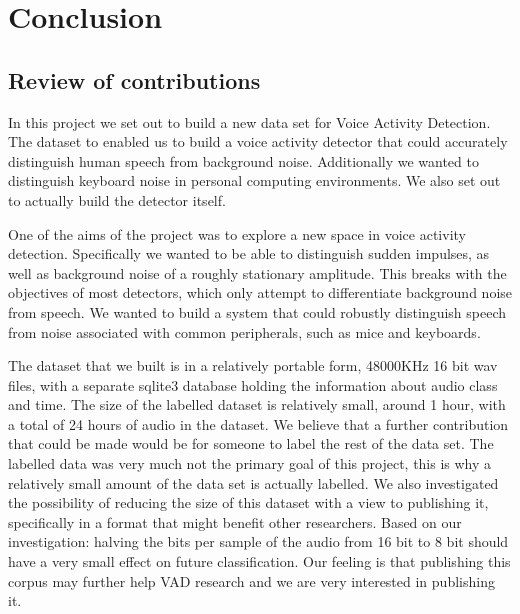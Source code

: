 \documentclass[ %
                    author={Sam Phippen},
                supervisor={Dr. Rafal Bogacz},
                     title={Real time voice activity detectors in noisy personal computing environments},
                  subtitle={},
                    degree={MEng},
                      year={2012} ]{thesis}
\begin{document}

\chapter{Conclusion}
\label{chap:conclusion}

\section{Review of contributions}

In this project we set out to build a new data set for Voice Activity
Detection.  The dataset to enabled us to build a voice activity detector that
could accurately distinguish human speech from background noise.  Additionally
we wanted to distinguish keyboard noise in personal computing environments. We
also set out to actually build the detector itself.


One of the aims of the project was to explore a new space in voice activity
detection.  Specifically we wanted to be able to distinguish sudden impulses,
as well as background noise of a roughly stationary amplitude. This breaks with
the objectives of most detectors, which only attempt to differentiate
background noise from speech. We wanted to build a system that could robustly
distinguish speech from noise associated with common peripherals, such as mice
and keyboards.

The dataset that we built is in a relatively portable form, 48000KHz 16 bit wav
files, with a separate sqlite3 database holding the information about audio
class and time. The size of the labelled dataset is relatively small, around 1
hour, with a total of 24 hours of audio in the dataset. We believe that a
further contribution that could be made would be for someone to label the rest
of the data set. The labelled data was very much not the primary goal of this
project, this is why a relatively small amount of the data set is actually
labelled. We also investigated the possibility of reducing the size of this
dataset with a view to publishing it, specifically in a format that might
benefit other researchers. Based on our investigation: halving the bits per
sample of the audio from 16 bit to 8 bit should have a very small effect on
future classification. Our feeling is that publishing this corpus may further
help VAD research and we are very interested in publishing it.
\end{document}
